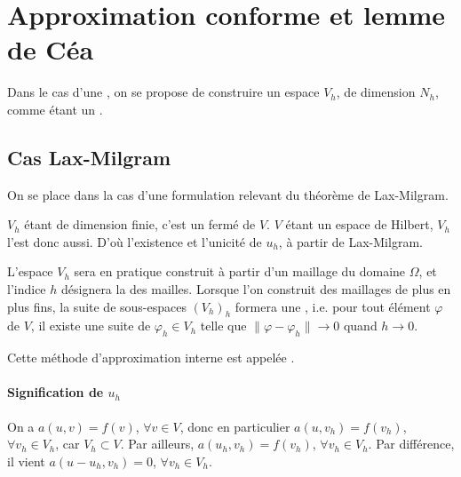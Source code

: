\medskip
\section{Approximation conforme et lemme de Céa}

Dans le cas d'une , on se propose de construire un espace $V_h$, de dimension $N_h$, comme
étant un .


\medskip
\subsection{Cas Lax-Milgram}

On se place dans la cas d'une formulation relevant du théorème de Lax-Milgram.

$V_h$ étant de dimension finie, c'est un fermé de $V$.
$V$ étant un espace de Hilbert, $V_h$ l'est donc aussi.
D'où l'existence et l'unicité de $u_h$, à partir de Lax-Milgram.

\medskip
L'espace $V_h$ sera en pratique construit à partir d'un maillage du domaine $\Omega$,
et l'indice $h$ désignera la  des mailles.
Lorsque l'on construit des maillages de plus en plus fins, la suite de sous-espaces
$(V_h)_h$ formera une  , i.e.
pour tout élément $\varphi$ de $V$, il existe une suite de $\varphi_h\in V_h$
telle que $\|\varphi-\varphi_h\|\rightarrow 0$ quand $h\rightarrow 0$.

Cette méthode d'approximation interne est appelée  .



\medskip
\paragraph{Signification de $u_h$}
On a $a(u,v) = f(v)$, $\forall v\in V$, donc en particulier
$a(u,v_h) = f(v_h)$, $\forall v_h\in V_h$, car $V_h\subset V$.
Par ailleurs, $a(u_h,v_h) = f(v_h)$, $\forall v_h\in V_h$.
Par différence, il vient $a(u-u_h,v_h) = 0$, $\forall v_h\in V_h$.

